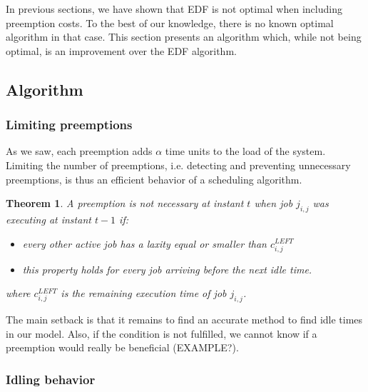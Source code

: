 \documentclass[a4paper,10pt]{article}
\newtheorem{theorem}{Theorem}
\begin{document}

    In previous sections, we have shown that EDF is not optimal when including preemption costs. To the best of our knowledge, there is no known optimal algorithm in that case. This section presents an algorithm which, while not being optimal, is an improvement over the EDF algorithm.

    \subsection{Algorithm}

    \subsubsection{Limiting preemptions}
    \label{sct:limPreemp}

        As we saw, each preemption adds $\alpha$ time units to the load of the system. Limiting the number of preemptions, i.e. detecting and preventing unnecessary preemptions, is thus an efficient behavior of a scheduling algorithm.\\

        \begin{theorem}
            \label{the:limPreemp}
            A preemption is not necessary at instant $t$ when job $j_{i,j}$ was executing at instant $t-1$ if:
            \begin{itemize}
                \item every other active job has a laxity equal or smaller than $c_{i,j}^{LEFT}$
                \item this property holds for every job arriving before the next idle time.
            \end{itemize}
            where $c_{i,j}^{LEFT}$ is the remaining execution time of job $j_{i,j}$.
        \end{theorem}

        The main setback is that it remains to find an accurate method to find idle times in our model. Also, if the condition is not fulfilled, we cannot know if a preemption would really be beneficial (EXAMPLE?).

    \subsubsection{Idling behavior}
    \label{sct:idlBehav}
\end{document}
